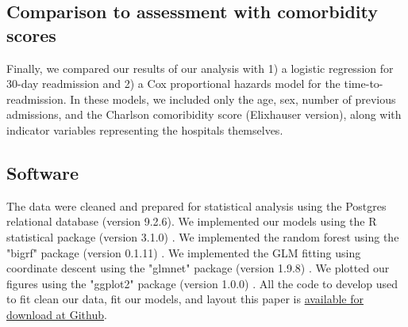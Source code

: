 \documentclass[]{article}\usepackage[]{graphicx}\usepackage[]{color}
\begin{document}





\subsection{Comparison to assessment with comorbidity scores}
Finally, we compared our results of our analysis with 1) a logistic regression for 30-day readmission and 2) a Cox proportional hazards model for the time-to-readmission. In these models, we included only the age, sex, number of previous admissions, and the Charlson comoribidity score (Elixhauser version), along with indicator variables representing the hospitals themselves.

\subsection{Software}
The data were cleaned and prepared for statistical analysis using the Postgres relational database (version 9.2.6). We implemented our models using the R statistical package (version 3.1.0) \supercite{team_r:_2014}. We implemented the random forest using the "bigrf" package (version 0.1.11) \supercite{lim_bigrf:_2014}. We implemented the GLM fitting using coordinate descent using the "glmnet" package (version 1.9.8) \supercite{friedman_regularization_2010}. We plotted our figures using the "ggplot2" package (version 1.0.0) \supercite{wickham_ggplot2:_2009}. All the code to develop used to fit clean our data, fit our models, and layout this paper is \href{https://github.com/nograpes/tmle_readmissions}{available for download at Github}.
\end{document}
